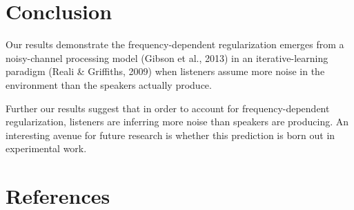 \documentclass[
  jou,floatsintext]{apa6}
\begin{document}
\section{Conclusion}\label{conclusion}

Our results demonstrate the frequency-dependent regularization emerges from a noisy-channel processing model (Gibson et al., 2013) in an iterative-learning paradigm (Reali \& Griffiths, 2009) when listeners assume more noise in the environment than the speakers actually produce.

Further our results suggest that in order to account for frequency-dependent regularization, listeners are inferring more noise than speakers are producing. An interesting avenue for future research is whether this prediction is born out in experimental work.

\newpage

\section{References}\label{references}
\end{document}
